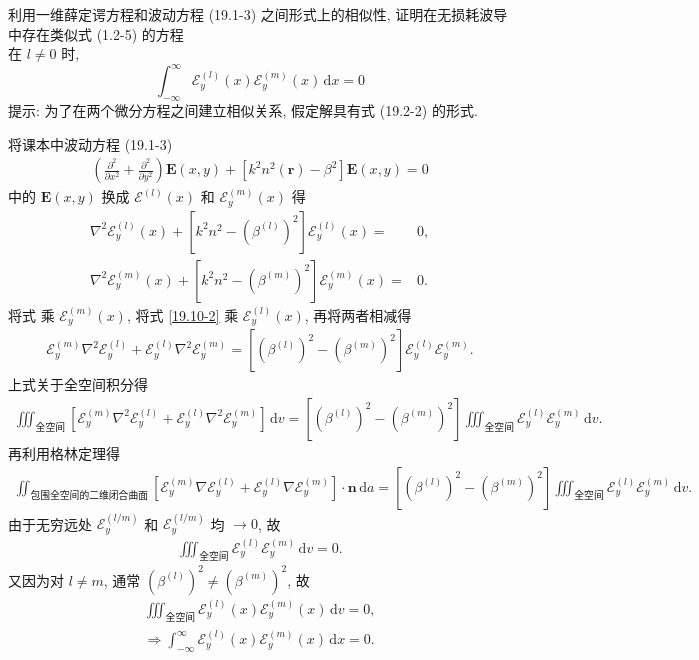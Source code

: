 \documentclass{note}
\begin{document}
\begin{exe}
    利用一维薛定谔方程和波动方程 (19.1-3) 之间形式上的相似性, 证明在无损耗波导中存在类似式 (1.2-5) 的方程\\
    在 $l\neq 0$ 时,
    \[
        \int_{-\infty}^{\infty}\mathcal{E}_y^{(l)}(x)\mathcal{E}_y^{(m)}(x)\,\mathrm{d}x=0
    \]
    提示: 为了在两个微分方程之间建立相似关系, 假定解具有式 (19.2-2) 的形式.
\end{exe}
\begin{pf}
    将课本中波动方程 (19.1-3)
    \begin{align}
        \left(\frac{\partial^2}{\partial x^2}+\frac{\partial^2}{\partial y^2}\right)\bm{E}(x,y)+[k^2n^2(\bm{r})-\beta^2]\bm{E}(x,y)=0
    \end{align}
    中的 $\bm{E}(x,y)$ 换成 $\mathcal{E}^{(l)}(x)$ 和 $\mathcal{E}_y^{(m)}(x)$ 得
    \begin{align}
        \label{19.10-1}
        \nabla^2\mathcal{E}_y^{(l)}(x)+[k^2n^2-(\beta^{(l)})^2]\mathcal{E}_y^{(l)}(x)=&0,\\
        \label{19.10-2}
        \nabla^2\mathcal{E}_y^{(m)}(x)+[k^2n^2-(\beta^{(m)})^2]\mathcal{E}_y^{(m)}(x)=&0.
    \end{align}
    将式 \label{19.10-1} 乘 $\mathcal{E}_y^{(m)}(x)$, 将式 \eqref{19.10-2} 乘 $\mathcal{E}_y^{(l)}(x)$, 再将两者相减得
    \begin{align}
        \mathcal{E}_y^{(m)}\nabla^2\mathcal{E}_y^{(l)}+\mathcal{E}_y^{(l)}\nabla^2\mathcal{E}_y^{(m)}=[(\beta^{(l)})^2-(\beta^{(m)})^2]\mathcal{E}_y^{(l)}\mathcal{E}_y^{(m)}.
    \end{align}
    上式关于全空间积分得
    \begin{align}
        \iiint_{\text{全空间}}[\mathcal{E}_y^{(m)}\nabla^2\mathcal{E}_y^{(l)}+\mathcal{E}_y^{(l)}\nabla^2\mathcal{E}_y^{(m)}]\,\mathrm{d}v=[(\beta^{(l)})^2-(\beta^{(m)})^2]\iiint_{\text{全空间}}\mathcal{E}_y^{(l)}\mathcal{E}_y^{(m)}\,\mathrm{d}v.
    \end{align}
    再利用格林定理得
    \begin{align}
        \iint_{\text{包围全空间的二维闭合曲面}}[\mathcal{E}_y^{(m)}\nabla\mathcal{E}_y^{(l)}+\mathcal{E}_y^{(l)}\nabla\mathcal{E}_y^{(m)}]\cdot\bm{n}\,\mathrm{d}a=[(\beta^{(l)})^2-(\beta^{(m)})^2]\iiint_{\text{全空间}}\mathcal{E}_y^{(l)}\mathcal{E}_y^{(m)}\,\mathrm{d}v.
    \end{align}
    由于无穷远处 $\mathcal{E}_y^{(l/m)}$ 和 $\mathcal{E}_y^{(l/m)}$ 均 $\rightarrow 0$, 故
    \begin{align}
        [(\beta^{(l)})^2-(\beta^{(m)})^2]\iiint_{\text{全空间}}\mathcal{E}_y^{(l)}\mathcal{E}_y^{(m)}\,\mathrm{d}v=0.
    \end{align}
    又因为对 $l\neq m$, 通常 $(\beta^{(l)})^2\neq(\beta^{(m)})^2$, 故
    \begin{gather}
        \iiint_{\text{全空间}}\mathcal{E}_y^{(l)}(x)\mathcal{E}_y^{(m)}(x)\,\mathrm{d}v=0,\\
        \Longrightarrow\int_{-\infty}^{\infty}\mathcal{E}_y^{(l)}(x)\mathcal{E}_y^{(m)}(x)\,\mathrm{d}x=0.
    \end{gather}
\end{pf}
\ifx\allfiles\undefined
\end{document}
